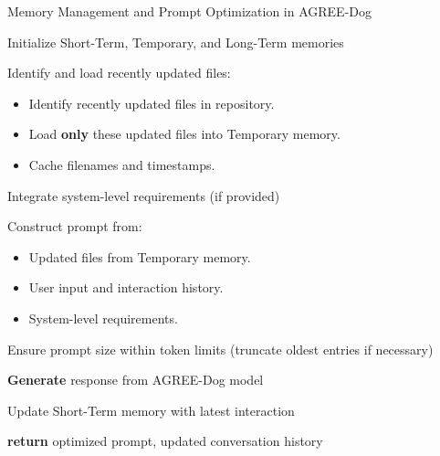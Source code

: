 \begin{algorithm}[htbp]
\caption{Memory Management and Prompt Optimization in AGREE-Dog}
\label{alg:memory-management}


Initialize Short-Term, Temporary, and Long-Term memories\;

Identify and load recently updated files:
\begin{itemize}
    \item Identify recently updated files in repository.
    \item Load \textbf{only} these updated files into Temporary memory.
    \item Cache filenames and timestamps.
\end{itemize}

Integrate system-level requirements (if provided)\;

Construct prompt from:
\begin{itemize}
    \item Updated files from Temporary memory.
    \item User input and interaction history.
    \item System-level requirements.
\end{itemize}

Ensure prompt size within token limits (truncate oldest entries if necessary)\;

\textbf{Generate} response from AGREE-Dog model\;

Update Short-Term memory with latest interaction\;



\textbf{return} optimized prompt, updated conversation history\;

\end{algorithm}